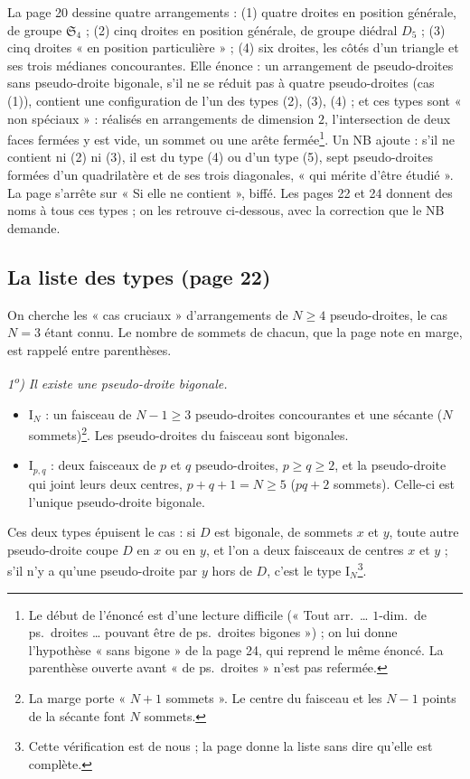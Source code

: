 \documentclass[11pt,a4paper]{article}
\begin{document}
La page 20 dessine quatre arrangements : (1) quatre droites en position
générale, de groupe $\mathfrak{S}_4$ ; (2) cinq droites en position
générale, de groupe diédral $D_5$ ; (3) cinq droites « en position
particulière » ; (4) six droites, les côtés d'un triangle et ses trois
médianes concourantes. Elle énonce : un arrangement de pseudo-droites sans
pseudo-droite bigonale, s'il ne se réduit pas à quatre pseudo-droites (cas
(1)), contient une configuration de l'un des types (2), (3), (4) ; et ces
types sont « non spéciaux » : réalisés en arrangements de dimension $2$,
l'intersection de deux faces fermées y est vide, un sommet ou une arête
fermée\footnote{Le début de l'énoncé est d'une lecture difficile
(« Tout arr.\ \ldots{} $1$-dim.\ de ps.\ droites \ldots{} pouvant être de
ps.\ droites bigones ») ; on lui donne l'hypothèse « sans bigone » de la page
24, qui reprend le même énoncé. La parenthèse ouverte avant « de
ps.\ droites » n'est pas refermée.}. Un NB ajoute : s'il ne contient ni (2) ni
(3), il est du type (4) ou d'un type (5), sept pseudo-droites formées d'un
quadrilatère et de ses trois diagonales, « qui mérite d'être étudié ». La
page s'arrête sur « Si elle ne contient », biffé. Les pages 22 et 24 donnent
des noms à tous ces types ; on les retrouve ci-dessous, avec la correction
que le NB demande.

\subsection*{La liste des types (page 22)}

On cherche les « cas cruciaux » d'arrangements de $N \geqslant 4$
pseudo-droites, le cas $N = 3$ étant connu. Le nombre de sommets de chacun,
que la page note en marge, est rappelé entre parenthèses.

\emph{1\textsuperscript{o}) Il existe une pseudo-droite bigonale.}
\begin{itemize}
  \item $\mathrm{I}_N$ : un faisceau de $N - 1 \geqslant 3$ pseudo-droites
  concourantes et une sécante ($N$ sommets)\footnote{La marge porte
  « $N+1$ sommets ». Le centre du faisceau et les $N-1$ points de la sécante
  font $N$ sommets.}. Les pseudo-droites du faisceau sont bigonales.
  \item $\mathrm{I}_{p,q}$ : deux faisceaux de $p$ et $q$ pseudo-droites,
  $p \geqslant q \geqslant 2$, et la pseudo-droite qui joint leurs deux
  centres, $p + q + 1 = N \geqslant 5$ ($pq + 2$ sommets). Celle-ci est
  l'unique pseudo-droite bigonale.
\end{itemize}
Ces deux types épuisent le cas : si $D$ est bigonale, de sommets $x$ et $y$,
toute autre pseudo-droite coupe $D$ en $x$ ou en $y$, et l'on a deux
faisceaux de centres $x$ et $y$ ; s'il n'y a qu'une pseudo-droite par $y$
hors de $D$, c'est le type $\mathrm{I}_N$\footnote{Cette vérification est de
nous ; la page donne la liste sans dire qu'elle est complète.}.
\end{document}
